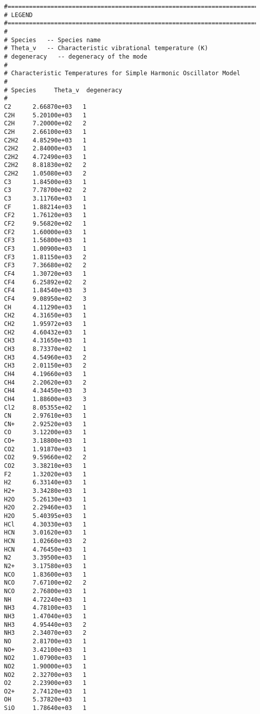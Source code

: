 \linenumbers*
\begin{verbatim}
#===========================================================================
# LEGEND
#===========================================================================
#
# Species 	-- Species name
# Theta_v	-- Characteristic vibrational temperature (K)
# degeneracy   -- degeneracy of the mode
#
# Characteristic Temperatures for Simple Harmonic Oscillator Model
#
# Species     Theta_v  degeneracy
#
C2      2.66870e+03   1
C2H     5.20100e+03   1
C2H     7.20000e+02   2
C2H     2.66100e+03   1
C2H2    4.85290e+03   1
C2H2    2.84000e+03   1
C2H2    4.72490e+03   1
C2H2    8.81830e+02   2
C2H2    1.05080e+03   2
C3      1.84500e+03   1
C3      7.78700e+02   2
C3      3.11760e+03   1
CF      1.88214e+03   1
CF2     1.76120e+03   1
CF2     9.56820e+02   1
CF2     1.60000e+03   1
CF3     1.56800e+03   1
CF3     1.00900e+03   1
CF3     1.81150e+03   2
CF3     7.36680e+02   2
CF4     1.30720e+03   1
CF4     6.25892e+02   2
CF4     1.84540e+03   3
CF4     9.08950e+02   3
CH      4.11290e+03   1
CH2     4.31650e+03   1
CH2     1.95972e+03   1
CH2     4.60432e+03   1
CH3     4.31650e+03   1
CH3     8.73370e+02   1
CH3     4.54960e+03   2
CH3     2.01150e+03   2
CH4     4.19660e+03   1
CH4     2.20620e+03   2
CH4     4.34450e+03   3
CH4     1.88600e+03   3
Cl2     8.05355e+02   1
CN      2.97610e+03   1
CN+     2.92520e+03   1
CO      3.12200e+03   1
CO+     3.18800e+03   1
CO2     1.91870e+03   1
CO2     9.59660e+02   2
CO2     3.38210e+03   1
F2      1.32020e+03   1
H2      6.33140e+03   1
H2+     3.34280e+03   1
H2O     5.26130e+03   1
H2O     2.29460e+03   1
H2O     5.40395e+03   1
HCl     4.30330e+03   1
HCN     3.01620e+03   1
HCN     1.02660e+03   2
HCN     4.76450e+03   1
N2      3.39500e+03   1
N2+     3.17580e+03   1
NCO     1.83600e+03   1
NCO     7.67100e+02   2
NCO     2.76800e+03   1
NH      4.72240e+03   1
NH3     4.78100e+03   1
NH3     1.47040e+03   1
NH3     4.95440e+03   2
NH3     2.34070e+03   2
NO      2.81700e+03   1
NO+     3.42100e+03   1
NO2     1.07900e+03   1
NO2     1.90000e+03   1
NO2     2.32700e+03   1
O2      2.23900e+03   1
O2+     2.74120e+03   1
OH      5.37820e+03   1
SiO     1.78640e+03   1
\end{verbatim}
\nolinenumbers
